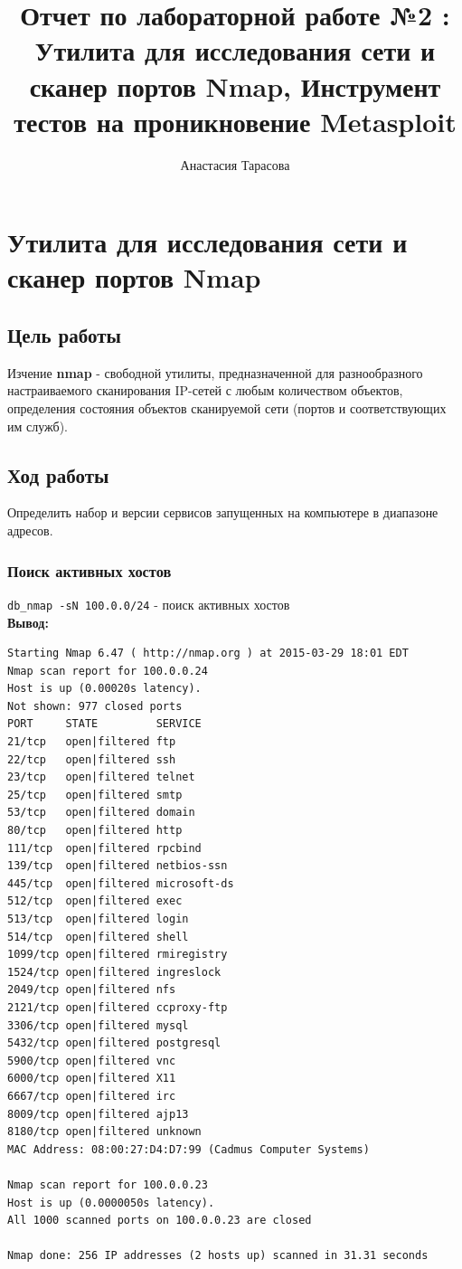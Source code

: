 \documentclass[12pt,a4paper]{article}
\author{Анастасия Тарасова}
\title{Отчет по лабораторной работе №2 :\\ Утилита для исследования сети и сканер портов Nmap, Инструмент тестов на проникновение Metasploit}
\begin{document}
\maketitle
\section{Утилита для исследования сети и сканер портов Nmap}
\subsection{Цель работы}
Изчение \textbf{nmap} - свободной утилиты, предназначенной для разнообразного настраиваемого сканирования IP-сетей с любым количеством объектов, определения состояния объектов сканируемой сети (портов и соответствующих им служб).
\subsection{Ход работы}
Определить набор и версии сервисов запущенных на компьютере в диапазоне адресов.

\subsubsection{Поиск активных хостов}

\verb+db_nmap -sN 100.0.0/24+ - поиск активных хостов\\

\textbf{Вывод:}

\begin{lstlisting}
Starting Nmap 6.47 ( http://nmap.org ) at 2015-03-29 18:01 EDT
Nmap scan report for 100.0.0.24
Host is up (0.00020s latency).
Not shown: 977 closed ports
PORT     STATE         SERVICE
21/tcp   open|filtered ftp
22/tcp   open|filtered ssh
23/tcp   open|filtered telnet
25/tcp   open|filtered smtp
53/tcp   open|filtered domain
80/tcp   open|filtered http
111/tcp  open|filtered rpcbind
139/tcp  open|filtered netbios-ssn
445/tcp  open|filtered microsoft-ds
512/tcp  open|filtered exec
513/tcp  open|filtered login
514/tcp  open|filtered shell
1099/tcp open|filtered rmiregistry
1524/tcp open|filtered ingreslock
2049/tcp open|filtered nfs
2121/tcp open|filtered ccproxy-ftp
3306/tcp open|filtered mysql
5432/tcp open|filtered postgresql
5900/tcp open|filtered vnc
6000/tcp open|filtered X11
6667/tcp open|filtered irc
8009/tcp open|filtered ajp13
8180/tcp open|filtered unknown
MAC Address: 08:00:27:D4:D7:99 (Cadmus Computer Systems)

Nmap scan report for 100.0.0.23
Host is up (0.0000050s latency).
All 1000 scanned ports on 100.0.0.23 are closed

Nmap done: 256 IP addresses (2 hosts up) scanned in 31.31 seconds

\end{lstlisting}
\newpage
\end{document}
